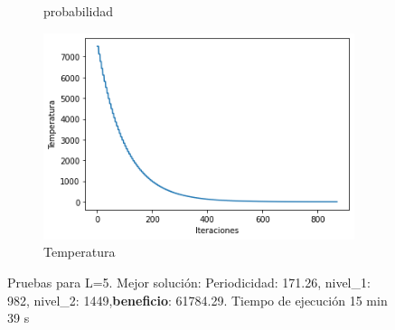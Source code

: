 \documentclass[a4paper,12pt]{article}
\begin{document}
\begin{figure}[H]
\begin{subfigure}{0.24\textwidth}
			\caption{probabilidad}
		\end{subfigure}
		\hfill
		\begin{subfigure}{0.24\textwidth}
			\centering
			\includegraphics[width=\textwidth]{include/L5/temperatura.png}
			\caption{Temperatura}
		\end{subfigure}
		\caption{Pruebas para L=5. Mejor solución: Periodicidad: 171.26, nivel_1: 982,  nivel_2: 1449,\textbf{beneficio}: 61784.29. Tiempo de ejecución 15 min 39 s}
	\end{figure}
\end{document}
